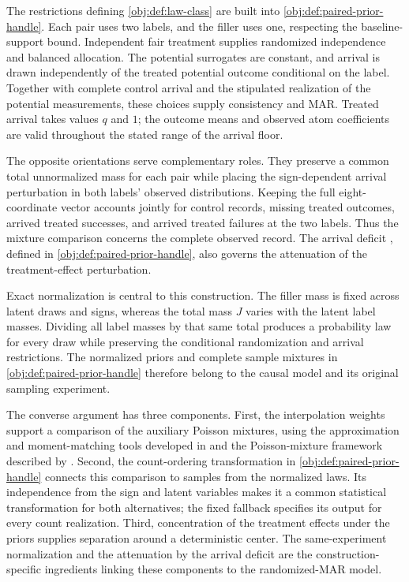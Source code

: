 \documentclass[11pt]{article}
\begin{document}
The restrictions defining \cref{obj:def:law-class} are built into \cref{obj:def:paired-prior-handle}. Each pair uses two labels, and the filler uses one, respecting the baseline-support bound. Independent fair treatment supplies randomized independence and balanced allocation. The potential surrogates are constant, and arrival is drawn independently of the treated potential outcome conditional on the label. Together with complete control arrival and the stipulated realization of the potential measurements, these choices supply consistency and MAR. Treated arrival takes values \(q\) and \(1\); the outcome means and observed atom coefficients are valid throughout the stated range of the arrival floor.

The opposite orientations serve complementary roles. They preserve a common total unnormalized mass for each pair while placing the sign-dependent arrival perturbation in both labels' observed distributions. Keeping the full eight-coordinate vector accounts jointly for control records, missing treated outcomes, arrived treated successes, and arrived treated failures at the two labels. Thus the mixture comparison concerns the complete observed record. The arrival deficit , defined in \cref{obj:def:paired-prior-handle}, also governs the attenuation of the treatment-effect perturbation.

Exact normalization is central to this construction. The filler mass is fixed across latent draws and signs, whereas the total mass \(J\) varies with the latent label masses. Dividing all label masses by that same total produces a probability law for every draw while preserving the conditional randomization and arrival restrictions. The normalized priors  and complete sample mixtures  in \cref{obj:def:paired-prior-handle} therefore belong to the causal model and its original sampling experiment.

The converse argument has three components. First, the interpolation weights support a comparison of the auxiliary Poisson mixtures, using the approximation and moment-matching tools developed in \citet{WuYang2016} and the Poisson-mixture framework described by \citet{Wu2020}. Second, the count-ordering transformation in \cref{obj:def:paired-prior-handle} connects this comparison to samples from the normalized laws. Its independence from the sign and latent variables makes it a common statistical transformation for both alternatives; the fixed fallback specifies its output for every count realization. Third, concentration of the treatment effects under the priors supplies separation around a deterministic center. The same-experiment normalization and the attenuation by the arrival deficit are the construction-specific ingredients linking these components to the randomized-MAR model.
\end{document}
